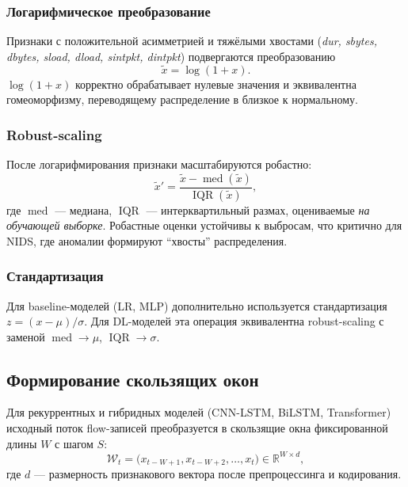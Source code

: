 \subsubsection{Логарифмическое преобразование}

Признаки с положительной асимметрией и тяжёлыми хвостами (\emph{dur, sbytes,
dbytes, sload, dload, sintpkt, dintpkt}) подвергаются преобразованию
\begin{equation}
\tilde{x} = \log(1 + x).
\label{eq:log1p}
\end{equation}
\(\log(1+x)\) корректно обрабатывает нулевые значения и эквивалентна
гомеоморфизму, переводящему распределение в близкое к нормальному.

\subsubsection{Robust-scaling}

После логарифмирования признаки масштабируются робастно:
\begin{equation}
\tilde{x}' = \frac{\tilde{x} - \operatorname{med}(\tilde{x})}
                  {\operatorname{IQR}(\tilde{x})},
\label{eq:robust-scaler}
\end{equation}
где \(\operatorname{med}\) --- медиана, \(\operatorname{IQR}\) ---
интерквартильный размах, оцениваемые \emph{на обучающей выборке}.
Робастные оценки устойчивы к выбросам, что критично для NIDS, где
аномалии формируют ``хвосты'' распределения.

\subsubsection{Стандартизация}

Для baseline-моделей (LR, MLP) дополнительно используется стандартизация
\(z = (x - \mu)/\sigma\). Для DL-моделей эта операция эквивалентна robust-scaling
с заменой \(\operatorname{med} \to \mu\), \(\operatorname{IQR} \to \sigma\).

\subsection{Формирование скользящих окон}

Для рекуррентных и гибридных моделей (CNN-LSTM, BiLSTM, Transformer)
исходный поток flow-записей преобразуется в скользящие окна фиксированной
длины \(W\) с шагом \(S\):
\[
\mathcal{W}_t = \bigl(x_{t-W+1}, x_{t-W+2}, \dots, x_t\bigr) \in \mathbb{R}^{W \times d},
\]
где \(d\) --- размерность признакового вектора после препроцессинга и
кодирования.

